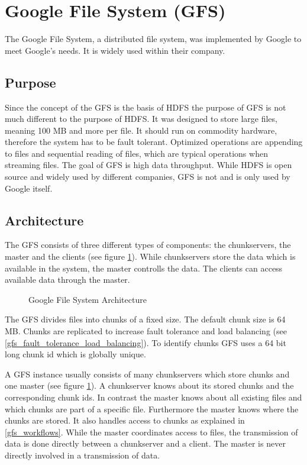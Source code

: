 \documentclass{sig-alternate}
\begin{document}
\section{Google File System (GFS)}
The Google File System, a distributed file system, was implemented by Google to meet Google's needs. It is widely used within their company.
\subsection{Purpose}
Since the concept of the GFS is the basis of HDFS the purpose of GFS is not much different to the purpose of HDFS. It was designed to store large files, meaning 100 MB and more per file. It should run on commodity hardware, therefore the system has to be fault tolerant. Optimized operations are appending to files and sequential reading of files, which are typical operations when streaming files. The goal of GFS is high data throughput.
While HDFS is open source and widely used by different companies, GFS is not and is only used by Google itself.

\subsection{Architecture}
The GFS consists of three different types of components: the chunkservers, the master and the clients (see figure \ref{fig:gfs_architecture}). While chunkservers store the data which is available in the system, the master controlls the data. The clients can access available data through the master.

\begin{figure}[!hbt]
\centering
{}
\caption{Google File System Architecture}
\label{fig:gfs_architecture}
\end{figure}

The GFS divides files into chunks of a fixed size. The default chunk size is 64 MB.
Chunks are replicated to increase fault tolerance and load balancing (see \ref{gfs_fault_tolerance_load_balancing}). To identify chunks GFS uses a 64 bit long chunk id which is globally unique.~\cite{google1}

A GFS instance usually consists of many chunkservers which store chunks and one master (see figure \ref{fig:gfs_architecture}). A chunkserver knows about its stored chunks and the corresponding chunk ids. In contrast the master knows about all existing files and which chunks are part of a specific file. Furthermore the master knows where the chunks are stored. It also handles access to chunks as explained in \ref{gfs_workflows}. While the master coordinates access to files, the transmission of data is done directly between a chunkserver and a client. The master is never directly involved in a transmission of data.
\end{document}
